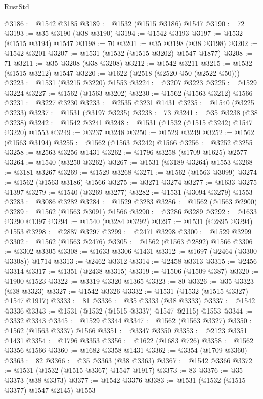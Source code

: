\begin{lexlean}{RustStd}
\begin{coremodule}
{\begin{coremodule}
{{{{{{{{{{{{{{{{{{{{{{{{{{{{{{{{@3186 := @1542 @3185
@3189 := @1532 (@1515 @3186) @1547
@3190 := 72
@3193 := @35 @3190 (@38 @3190)
@3194 := @1542 @3193
@3197 := @1532 (@1515 @3194) @1547
@3198 := 70
@3201 := @35 @3198 (@38 @3198)
@3202 := @1542 @3201
@3207 := @1531 (@1532 (@1515 @3202) @1547 @1877)
@3208 := 71
@3211 := @35 @3208 (@38 @3208)
@3212 := @1542 @3211
@3215 := @1532 (@1515 @3212) @1547
@3220 := @1622 (@2518 (@2520 @50 (@2522 @50)))
@3223 := @1531 (@3215 @3220) @1553
@3224 := @3207 @3223
@3225 := @1529 @3224
@3227 := @1562 (@1563 @3202)
@3230 := @1562 (@1563 @3212) @1566
@3231 := @3227 @3230
@3233 := @2535 @3231 @1431
@3235 := @1540 (@3225 @3233)
@3237 := @1531 (@3197 @3235)
@3238 := 73
@3241 := @35 @3238 (@38 @3238)
@3242 := @1542 @3241
@3248 := @1531 (@1532 (@1515 @3242) @1547 @3220) @1553
@3249 := @3237 @3248
@3250 := @1529 @3249
@3252 := @1562 (@1563 @3194)
@3255 := @1562 (@1563 @3242) @1566
@3256 := @3252 @3255
@3258 := @2563 @3256 @1431
@3262 := @1796 @3258 (@1709 @1625) @2577
@3264 := @1540 (@3250 @3262)
@3267 := @1531 (@3189 @3264) @1553
@3268 := @3181 @3267
@3269 := @1529 @3268
@3271 := @1562 (@1563 @3099)
@3274 := @1562 (@1563 @3186) @1566
@3275 := @3271 @3274
@3277 := @1633 @3275 @1397
@3279 := @1540 (@3269 @3277)
@3282 := @1531 (@3094 @3279) @1553
@3283 := @3086 @3282
@3284 := @1529 @3283
@3286 := @1562 (@1563 @2900)
@3289 := @1562 (@1563 @3091) @1566
@3290 := @3286 @3289
@3292 := @1633 @3290 @1397
@3294 := @1540 (@3284 @3292)
@3297 := @1531 (@2895 @3294) @1553
@3298 := @2887 @3297
@3299 := @2471 @3298
@3300 := @1529 @3299
@3302 := @1562 (@1563 @2476)
@3305 := @1562 (@1563 @2892) @1566
@3306 := @3302 @3305
@3308 := @1633 @3306 @1431
@3312 := @1697 (@2464 (@3300 @3308)) @1714
@3313 := @2462 @3312
@3314 := @2458 @3313
@3315 := @2456 @3314
@3317 := @1351 (@2438 @3315)
@3319 := @1506 (@1509 @387)
@3320 := @1900 @1523
@3322 := @3319 @3320 @1365
@3323 := 80
@3326 := @35 @3323 (@38 @3323)
@3327 := @1542 @3326
@3332 := @1531 (@1532 (@1515 @3327) @1547 @1917)
@3333 := 81
@3336 := @35 @3333 (@38 @3333)
@3337 := @1542 @3336
@3343 := @1531 (@1532 (@1515 @3337) @1547 @2115) @1553
@3344 := @3332 @3343
@3345 := @1529 @3344
@3347 := @1562 (@1563 @3327)
@3350 := @1562 (@1563 @3337) @1566
@3351 := @3347 @3350
@3353 := @2123 @3351 @1431
@3354 := @1796 @3353
@3356 := @1622 (@1683 @726)
@3358 := @1562 @3356 @1566
@3360 := @1682 @3358 @1431
@3362 := @3354 (@1709 @3360)
@3363 := 82
@3366 := @35 @3363 (@38 @3363)
@3367 := @1542 @3366
@3372 := @1531 (@1532 (@1515 @3367) @1547 @1917)
@3373 := 83
@3376 := @35 @3373 (@38 @3373)
@3377 := @1542 @3376
@3383 := @1531 (@1532 (@1515 @3377) @1547 @2145) @1553
}}}}}}}}}}}}}}}}}}}}}}}}}}}}}}}}
\end{coremodule}}
\end{coremodule}
\end{lexlean}
